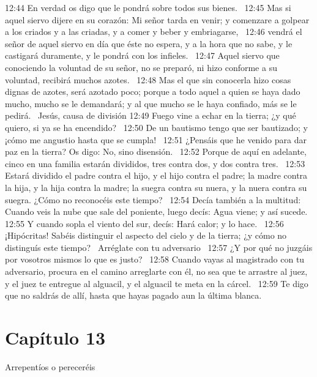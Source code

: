 12:44 En verdad os digo que le pondrá sobre todos sus bienes.  
12:45 Mas si aquel siervo dijere en su corazón: Mi señor tarda en venir; y comenzare a golpear a los criados y a las criadas, y a comer y beber y embriagarse,  
12:46 vendrá el señor de aquel siervo en día que éste no espera, y a la hora que no sabe, y le castigará duramente, y le pondrá con los infieles.  
12:47 Aquel siervo que conociendo la voluntad de su señor, no se preparó, ni hizo conforme a su voluntad, recibirá muchos azotes.  
12:48 Mas el que sin conocerla hizo cosas dignas de azotes, será azotado poco; porque a todo aquel a quien se haya dado mucho, mucho se le demandará; y al que mucho se le haya confiado, más se le pedirá.  
Jesús, causa de división  
12:49 Fuego vine a echar en la tierra; ¿y qué quiero, si ya se ha encendido?  
12:50 De un bautismo tengo que ser bautizado; y ¡cómo me angustio hasta que se cumpla!  
12:51 ¿Pensáis que he venido para dar paz en la tierra? Os digo: No, sino disensión.  
12:52 Porque de aquí en adelante, cinco en una familia estarán divididos, tres contra dos, y dos contra tres.  
12:53 Estará dividido el padre contra el hijo, y el hijo contra el padre; la madre contra la hija, y la hija contra la madre; la suegra contra su nuera, y la nuera contra su suegra. 
¿Cómo no reconocéis este tiempo?   
12:54 Decía también a la multitud: Cuando veis la nube que sale del poniente, luego decís: Agua viene; y así sucede.  
12:55 Y cuando sopla el viento del sur, decís: Hará calor; y lo hace.  
12:56 ¡Hipócritas! Sabéis distinguir el aspecto del cielo y de la tierra; ¿y cómo no distinguís este tiempo?  
Arréglate con tu adversario  
12:57 ¿Y por qué no juzgáis por vosotros mismos lo que es justo?  
12:58 Cuando vayas al magistrado con tu adversario, procura en el camino arreglarte con él, no sea que te arrastre al juez, y el juez te entregue al alguacil, y el alguacil te meta en la cárcel.  
12:59 Te digo que no saldrás de allí, hasta que hayas pagado aun la última blanca. 
\section*{Capítulo 13}
Arrepentíos o pereceréis  

